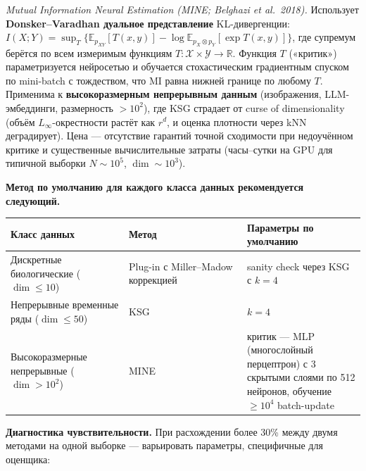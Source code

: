\documentclass[pdflatex,sn-mathphys-ay]{sn-jnl}
\begin{document}
\emph{Mutual Information Neural Estimation (MINE; Belghazi et al.~2018).} Использует \textbf{Donsker--Varadhan дуальное представление} KL-дивергенции: \(I(X; Y) = \sup_T \{\mathbb{E}_{p_{XY}}[T(x, y)] - \log \mathbb{E}_{p_X \otimes p_Y}[\exp T(x, y)]\}\), где супремум берётся по всем измеримым функциям \(T: \mathcal{X} \times \mathcal{Y} \to \mathbb{R}\). Функция \(T\) («критик») параметризуется нейросетью и обучается стохастическим градиентным спуском по mini-batch с тождеством, что MI равна нижней границе по любому \(T\). Применима к \textbf{высокоразмерным непрерывным данным} (изображения, LLM-эмбеддинги, размерность \(> 10^2\)), где KSG страдает от curse of dimensionality (объём \(L_\infty\)-окрестности растёт как \(r^d\), и оценка плотности через kNN деградирует). Цена --- отсутствие гарантий точной сходимости при недоучённом критике и существенные вычислительные затраты (часы--сутки на GPU для типичной выборки \(N \sim 10^5\), \(\dim \sim 10^3\)).

\textbf{Метод по умолчанию для каждого класса данных рекомендуется следующий.}

\begin{center}\small
\begin{tabular}{@{} >{\raggedright\arraybackslash}p{0.3333\linewidth} >{\raggedright\arraybackslash}p{0.3333\linewidth} >{\raggedright\arraybackslash}p{0.3333\linewidth}@{}}
\toprule
\begin{minipage}[b]{\linewidth}\raggedright
Класс данных
\end{minipage} & \begin{minipage}[b]{\linewidth}\raggedright
Метод
\end{minipage} & \begin{minipage}[b]{\linewidth}\raggedright
Параметры по умолчанию
\end{minipage} \\
\midrule
Дискретные биологические (\(\dim \le 10\)) & Plug-in с Miller--Madow коррекцией & sanity check через KSG с \(k = 4\) \\
Непрерывные временные ряды (\(\dim \le 50\)) & KSG & \(k = 4\) \\
Высокоразмерные непрерывные (\(\dim > 10^2\)) & MINE & критик --- MLP (многослойный перцептрон) с 3 скрытыми слоями по 512 нейронов, обучение \(\ge 10^4\) batch-update \\
\bottomrule
\end{tabular}
\end{center}

\textbf{Диагностика чувствительности.} При расхождении более 30\% между двумя методами на одной выборке --- варьировать параметры, специфичные для оценщика:
\end{document}
